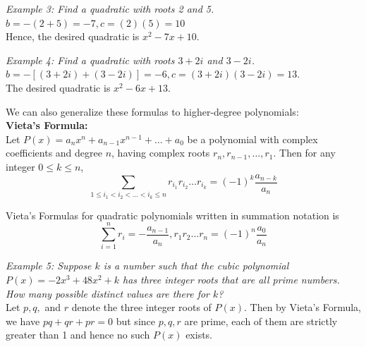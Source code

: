 \documentclass{article}
\begin{document}
    \noindent \color{blue} \textit{Example 3: Find a quadratic with roots 2 and 5.} \color{black} \\
    $b=-(2+5)=-7, c=(2)(5)=10$ \\
    Hence, the desired quadratic is $x^2-7x+10$.

    \pagebreak
    \noindent \color{blue} \textit{Example 4: Find a quadratic with roots $3+2i$ and $3-2i$.} \color{black} \\
    \noindent $b=-[(3+2i)+(3-2i)] = -6,c=(3+2i)(3-2i)=13$. \\
    \noindent The desired quadratic is $x^2-6x+13$.

    \noindent We can also generalize these formulas to higher-degree polynomials: \\
    \noindent \color{purple} \textbf{Vieta's Formula:} \color{black} \\
    Let $P(x)=a_n x^n + a_{n-1}x^{n-1}+\dots+a_0$ be a polynomial with complex coefficients
    and degree $n$, having complex roots $r_n, r_{n-1},\dots,r_1$. Then for any integer
    $0\leq k \leq n$, \\

    \begin{equation*}
        \sum\limits_{1\leq i_1 < i_2<\dots<i_k\leq n}   r_{i_1}r_{i_2}\dots r_{i_k}
        = (-1)^k \frac{a_{n-k}}{a_n}
    \end{equation*}

    \noindent Vieta's Formulas for quadratic polynomials written in summation notation is \\
    \begin{equation*}
        \sum\limits_{i=1}^n r_i     = -\frac{a_{n-1}}{a_n}, r_1r_2\dots r_n=(-1)^n\frac{a_0}{a_n}
    \end{equation*}

    \noindent \color{blue} \textit{Example 5: Suppose $k$ is a number such that the cubic
    polynomial $P(x)=-2x^3+48x^2+k$ has three integer roots that are all prime numbers. How
    many possible distinct values are there for $k$?} \color{black} \\

    \noindent Let $p,q,$ and $r$ denote the three integer roots of $P(x)$. Then by Vieta's
    Formula, we have $pq+qr+pr=0$ but since $p,q,r$ are prime, each of them are strictly
    greater than 1 and hence no such $P(x)$ exists.

    \pagebreak
\end{document}

